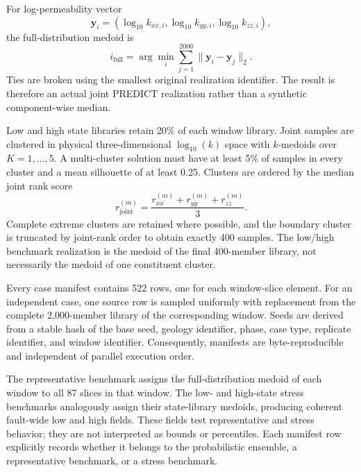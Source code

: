 For log-permeability vector
\begin{equation}
  \mathbf{y}_i =
  (\log_{10}k_{xx,i},\log_{10}k_{yy,i},\log_{10}k_{zz,i}),
\end{equation}
the full-distribution medoid is
\begin{equation}
  i_{\mathrm{full}}=
  \arg\min_i\sum_{j=1}^{2000}\lVert\mathbf{y}_i-\mathbf{y}_j\rVert_2.
  \label{eq:si-full-medoid}
\end{equation}
Ties are broken using the smallest original realization identifier. The
result is therefore an actual joint PREDICT realization rather than a
synthetic component-wise median.

Low and high state libraries retain 20\% of each window library. Joint samples
are clustered in physical three-dimensional $\log_{10}(k)$ space with
$k$-medoids over $K=1,\ldots,5$. A multi-cluster solution must have at least
5\% of samples in every cluster and a mean silhouette of at least 0.25.
Clusters are ordered by the median joint rank score
\begin{equation}
  r_{\mathrm{joint}}^{(m)} =
  \frac{r_{xx}^{(m)}+r_{yy}^{(m)}+r_{zz}^{(m)}}{3}.
\end{equation}
Complete extreme clusters are retained where possible, and the boundary
cluster is truncated by joint-rank order to obtain exactly 400 samples. The
low/high benchmark realization is the medoid of the final 400-member library,
not necessarily the medoid of one constituent cluster.


Every case manifest contains 522 rows, one for each window-slice element. For
an independent case, one source row is sampled uniformly with replacement from
the complete 2,000-member library of the corresponding window. Seeds are
derived from a stable hash of the base seed, geology identifier, phase, case
type, replicate identifier, and window identifier. Consequently, manifests
are byte-reproducible and independent of parallel execution order.

The representative benchmark assigns the full-distribution medoid of each
window to all 87 slices in that window. The low- and high-state stress
benchmarks analogously assign their state-library medoids, producing coherent
fault-wide low and high fields. These fields test representative and stress
behavior; they are not interpreted as bounds or percentiles. Each manifest
row explicitly records whether it belongs to the probabilistic ensemble, a
representative benchmark, or a stress benchmark. 

